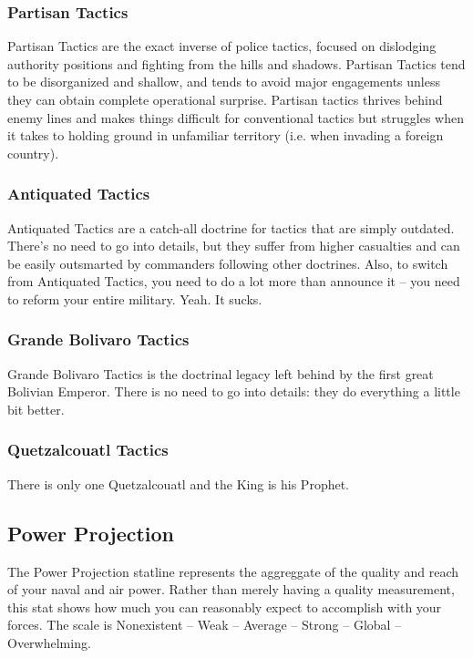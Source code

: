 \documentclass[11 pt]{scrartcl}
\begin{document}
\subsubsection*{Partisan Tactics}

Partisan Tactics are the exact inverse of police tactics, focused on dislodging authority positions and fighting from the hills and shadows. Partisan Tactics tend to be disorganized and shallow, and tends to avoid major engagements unless they can obtain complete operational surprise. Partisan tactics thrives behind enemy lines and makes things difficult for conventional tactics but struggles when it takes to holding ground in unfamiliar territory (i.e. when invading a foreign country).

\subsubsection*{Antiquated Tactics}

Antiquated Tactics are a catch-all doctrine for tactics that are simply outdated. There's no need to go into details, but they suffer from higher casualties and can be easily outsmarted by commanders following other doctrines. Also, to switch from Antiquated Tactics, you need to do a lot more than announce it -- you need to reform your entire military. Yeah. It sucks.

\subsubsection*{Grande Bolivaro Tactics}

Grande Bolivaro Tactics is the doctrinal legacy left behind by the first great Bolivian Emperor. There is no need to go into details: they do everything a little bit better.

\subsubsection*{Quetzalcouatl Tactics}

There is only one Quetzalcouatl and the King is his Prophet.

\subsection{Power Projection}

The Power Projection statline represents the aggreggate of the quality and reach of your naval and air power. Rather than merely having a quality measurement, this stat shows how much you can reasonably expect to accomplish with your forces. The scale is Nonexistent -- Weak -- Average -- Strong -- Global -- Overwhelming.
\end{document}
